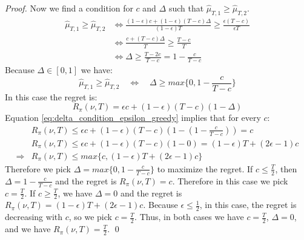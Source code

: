 \documentclass[opre,nonblindrev]{informs3} %
\begin{document}
\begin{proof}
    Now we find a condition for $c$ and $\Delta$ such that $\hat{\mu}_{T,1} \geq \hat{\mu}_{T,2}$.
    \begin{align}
        \hat{\mu}_{T,1} \geq \hat{\mu}_{T,2} &\iff \frac{(1-\epsilon)c+(1-\epsilon)(T-c)\Delta}{(1-\epsilon)T}\geq \frac{\epsilon(T-c)}{\epsilon T}\\ &\iff \frac{c+(T-c)\Delta}{T}\geq\frac{T-c}{T}\\
        &\iff \Delta \geq \frac{T-2c}{T-c} = 1 - \frac{c}{T-c}
    \end{align}
    Because $\Delta \in [0,1]$ we have:
    \begin{equation}
        \hat{\mu}_{T,1} \geq \hat{\mu}_{T,2} \quad\iff\quad \Delta \geq max\{0, 1 - \frac{c}{T-c}\} \label{eq:delta_condition_epsilon_greedy}
    \end{equation}
    In this case the regret is:
    \begin{equation}
        R_\pi(\nu, T) = \epsilon c + (1-\epsilon)(T-c)(1-\Delta)
    \end{equation}
    Equation \ref{eq:delta_condition_epsilon_greedy} implies that for every $c$:
    \begin{align}
        &R_\pi(\nu, T)\leq \epsilon c + (1-\epsilon)(T-c)(1-(1 - \frac{c}{T-c})) = c\\
        &R_\pi(\nu, T)\leq \epsilon c + (1-\epsilon)(T-c)(1-0) = (1-\epsilon)T+(2\epsilon-1)c\\
        \Longrightarrow & R_\pi(\nu, T)\leq max\{c, (1-\epsilon)T+(2\epsilon-1)c\}
    \end{align}
    Therefore we pick $\Delta = max\{0, 1 - \frac{c}{T-c}\}$ to maximize the regret. If $c\leq\frac{T}{2}$, then $\Delta=1-\frac{c}{T-c}$ and the regret is $R_\pi(\nu, T)=c$. Therefore in this case we pick $c=\frac{T}{2}$. If $c\geq\frac{T}{2}$, we have $\Delta=0$ and the regret is $R_\pi(\nu, T)=(1-\epsilon)T+(2\epsilon-1)c$. Because $\epsilon\leq\frac{1}{2}$, in this case, the regret is decreasing with $c$, so we pick $c=\frac{T}{2}$. Thus, in both cases we have $c=\frac{T}{2}$, $\Delta=0$, and we have $R_\pi(\nu, T) = \frac{T}{2}$. \qed
\end{proof}



\end{document}
